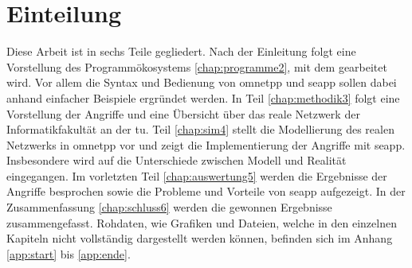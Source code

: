 \section{Einteilung}
Diese Arbeit ist in sechs Teile gegliedert. Nach der Einleitung folgt eine Vorstellung des Programmökosystems \ref{chap:programme2}, mit dem gearbeitet wird. Vor allem die Syntax und Bedienung von \gls{omnetpp} und \gls{seapp} sollen dabei anhand einfacher Beispiele ergründet werden. In Teil \ref{chap:methodik3} folgt eine Vorstellung der Angriffe und eine Übersicht über das reale Netzwerk der Informatikfakultät an der \gls{tu}. Teil \ref{chap:sim4} stellt die Modellierung des realen Netzwerks in \gls{omnetpp} vor und zeigt die Implementierung der Angriffe mit \gls{seapp}. Insbesondere wird auf die Unterschiede zwischen Modell und Realität eingegangen. Im vorletzten Teil \ref{chap:auswertung5} werden die Ergebnisse der Angriffe besprochen sowie die Probleme und Vorteile von \gls{seapp} aufgezeigt. In der Zusammenfassung \ref{chap:schluss6} werden die gewonnen Ergebnisse zusammengefasst. Rohdaten, wie Grafiken und Dateien, welche in den einzelnen Kapiteln nicht vollständig dargestellt werden können, befinden sich im Anhang \ref{app:start} bis \ref{app:ende}.
